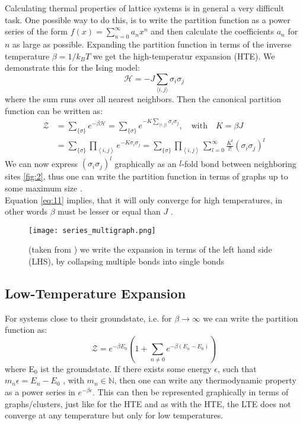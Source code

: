 \documentclass[a4paper,12pt]{article}
\begin{document}
Calculating thermal properties of lattice systems is in general a
very difficult task. One possible way to do this, is to write the
partition function as a power series of the form $f(x) =
\sum_{n=0}^{\infty} a_nx^n$ and then calculate the coefficients $a_n$
for $n$ as large as possible. Expanding the partition function in terms
of the inverse temperature $\beta =
1/k_BT$ we get the high-temperatur expansion (HTE).
We demonstrate this for the Ising model:
\begin{equation}
\label{eq:10}
\mathcal{H} = -J \sum\limits_{\langle i,j \rangle} \sigma_i \sigma_j
\end{equation}
where the sum runs over all nearest neighbors. Then the canonical
partition function can be written as:
\begin{align}
\label{eq:11}
\mathcal{Z} &= \sum\limits_{\{ \sigma \}} e^{-\beta \mathcal{H}} =
\sum\limits_{\{ \sigma \}} e^{-K \sum_{\langle i,j \rangle}
  \sigma_i \sigma_j}, \quad \text{with} \quad K = \beta J\\
&= \sum\limits_{\{ \sigma \}} \prod\limits_{\left\langle i,j
  \right\rangle} e^{-K \sigma_i \sigma_j} =  \sum\limits_{\{ \sigma \}} \prod\limits_{\left\langle i,j
  \right\rangle} \sum\limits_{l = 0}^{\infty} \frac{K^l}{l!}(\sigma_i
  \sigma_j )^l
\end{align}
We can now express $(\sigma_i \sigma_j)^l$ graphically as an $l$-fold
bond between neighboring sites \eqref{fig:2}, thus one can write the partition
function in terms of graphs up to some maximum size
\cite{Rigol,Series}.\\
Equation \eqref{eq:11} implies, that it will only converge for high
temperatures, in other words $\beta$ must be lesser or equal than $J$ \cite{Rigol}.

\begin{figure}[htbp]
\centerline{\texttt{[image: series\_multigraph.png]}}
\caption[]{\label{fig:2}  (taken from \cite{Series}) we write the expansion in terms of the left
  hand side (LHS), by collapsing multiple bonds into single bonds}
\end{figure}

\subsection{Low-Temperature Expansion}

For systems close to their groundstate, i.e. for $\beta \to \infty$
we can write the partition function as:
\begin{equation}
\label{eq:12}
\mathcal{Z} = e^{-\beta E_0} \left( 1 + \sum\limits_{n \neq 0}
  e^{-\beta (E_n - E_0)} \right)
\end{equation}
where E$_0$ ist the groundstate. If there exists some energy
$\epsilon$, such that $m_n \epsilon = E_n - E_0$ , with $m_n \in
\mathbb{N}$, then one can write any thermodynamic property as a power
series in $e^{-\beta \epsilon}$. This can then be represented
graphically in terms of  graphs/clusters, just like for the HTE
\cite{Rigol,Series} and as with the HTE, the LTE does not converge at
any temperature but only for low temperatures.
\end{document}
